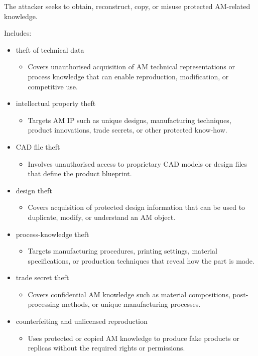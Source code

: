 \documentclass[10pt,a4paper,oneside]{report}
\begin{document}
The attacker seeks to obtain, reconstruct, copy, or misuse protected AM-related knowledge.

Includes:

\begin{itemize}
\item theft of technical data
\begin{itemize}
\item Covers unauthorised acquisition of AM technical representations or process knowledge that can enable reproduction, modification, or competitive use.
\end{itemize}
\item intellectual property theft
\begin{itemize}
\item Targets AM IP such as unique designs, manufacturing techniques, product innovations, trade secrets, or other protected know-how.
\end{itemize}
\item CAD file theft
\begin{itemize}
\item Involves unauthorised access to proprietary CAD models or design files that define the product blueprint.
\end{itemize}
\item design theft
\begin{itemize}
\item Covers acquisition of protected design information that can be used to duplicate, modify, or understand an AM object.
\end{itemize}
\item process-knowledge theft
\begin{itemize}
\item Targets manufacturing procedures, printing settings, material specifications, or production techniques that reveal how the part is made.
\end{itemize}
\item trade secret theft
\begin{itemize}
\item Covers confidential AM knowledge such as material compositions, post-processing methods, or unique manufacturing processes.
\end{itemize}
\item counterfeiting and unlicensed reproduction
\begin{itemize}
\item Uses protected or copied AM knowledge to produce fake products or replicas without the required rights or permissions.

\end{itemize}
\end{itemize}
\end{document}
